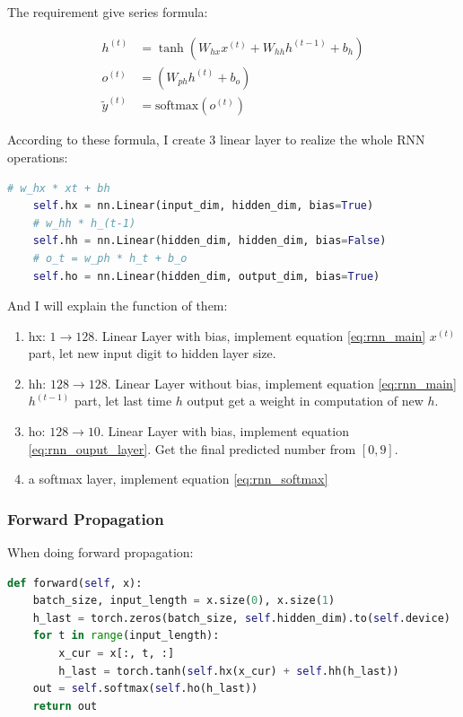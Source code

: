 \documentclass{article}
\begin{document}
The requirement give series formula:

\begin{align}
    h^{(t)} &= \tanh{(W_{hx}x^{(t)} + W_{hh}h^{(t-1)} + b_h)} \label{eq:rnn_main} \\ 
    o^{(t)} &= (W_{ph}h^{(t)} + b_o) \label{eq:rnn_ouput_layer} \\ 
    {\tilde{y}^{(t)}} &= \text{softmax}(o^{(t)}) \label{eq:rnn_softmax}
\end{align}

According to these formula, I create 3 linear layer to realize the whole RNN operations:

\begin{lstlisting}[language=Python]
    # w_hx * xt + bh
    self.hx = nn.Linear(input_dim, hidden_dim, bias=True)
    # w_hh * h_(t-1)
    self.hh = nn.Linear(hidden_dim, hidden_dim, bias=False)
    # o_t = w_ph * h_t + b_o
    self.ho = nn.Linear(hidden_dim, output_dim, bias=True)
\end{lstlisting}

And I will explain the function of them:

\begin{enumerate}
    \item hx: $1 \to 128$. Linear Layer with bias, implement equation \ref{eq:rnn_main} $x^{(t)}$ part, let new input digit to hidden layer size.
    \item hh: $128 \to 128$. Linear Layer without bias, implement equation \ref{eq:rnn_main} $h^{(t-1)}$ part, let last time $h$ output get a weight in computation of new $h$.
    \item ho: $128 \to 10$. Linear Layer with bias, implement equation \ref{eq:rnn_ouput_layer}. Get the final predicted number from $[0, 9]$.
    \item a softmax layer, implement equation \ref{eq:rnn_softmax}
\end{enumerate}

\subsubsection{Forward Propagation}

When doing forward propagation:

\begin{lstlisting}[language=Python]
def forward(self, x):
    batch_size, input_length = x.size(0), x.size(1)
    h_last = torch.zeros(batch_size, self.hidden_dim).to(self.device)
    for t in range(input_length):
        x_cur = x[:, t, :]
        h_last = torch.tanh(self.hx(x_cur) + self.hh(h_last))
    out = self.softmax(self.ho(h_last))
    return out
\end{lstlisting}
\end{document}
